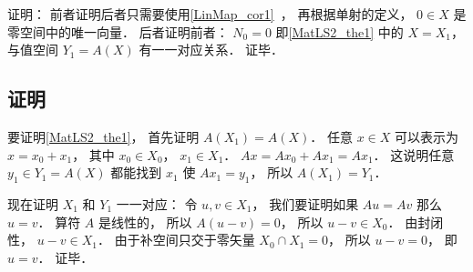 证明： 前者证明后者只需要使用\autoref{LinMap_cor1}~， 再根据单射的定义， $0\in X$ 是零空间中的唯一向量． 后者证明前者： $N_0 = 0$ 即\autoref{MatLS2_the1} 中的 $X = X_1$， 与值空间 $Y_1 = A(X)$ 有一一对应关系． 证毕．

\subsection{证明}
要证明\autoref{MatLS2_the1}， 首先证明 $A(X_1) = A(X)$． 任意 $x\in X$ 可以表示为 $x = x_0 + x_1$， 其中 $x_0\in X_0$， $x_1\in X_1$． $Ax = A x_0 + A x_1 = A x_1$． 这说明任意 $y_1 \in Y_1 = A(X)$ 都能找到 $x_1$ 使 $A x_1 = y_1$， 所以 $A(X_1) = Y_1$．

现在证明 $X_1$ 和 $Y_1$ 一一对应： 令 $u, v \in X_1$， 我们要证明如果 $Au = Av$ 那么 $u = v$． 算符 $A$ 是线性的， 所以 $A(u-v) = 0$， 所以 $u - v \in X_0$． 由封闭性， $u - v \in X_1$． 由于补空间只交于零矢量 $X_0 \cap X_1 = \qty{0}$， 所以 $u - v = 0$， 即 $u = v$． 证毕．

